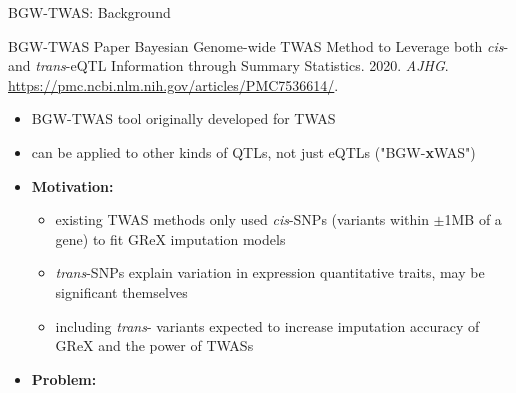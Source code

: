 \begin{frame}{BGW-TWAS: Background}
  \begin{block}{BGW-TWAS Paper}
    Bayesian Genome-wide TWAS Method to Leverage both \textit{cis}- and \textit{trans}-eQTL Information through Summary Statistics. 2020. \textit{AJHG}. \url{https://pmc.ncbi.nlm.nih.gov/articles/PMC7536614/}.
  \end{block}
  \begin{itemize}[<+(1)->]
    \item BGW-TWAS\cite{luninghamBayesianGenomewideTWAS2020} tool originally developed for TWAS
    \item can be applied to other kinds of QTLs, not just eQTLs ("BGW-\textbf{x}WAS")
    \item \textbf{Motivation:}
    \begin{itemize}[<+->]
      \item existing TWAS methods only used \textit{cis}-SNPs (variants within $\pm$1MB of a gene) to fit GReX imputation models
      \item \textit{trans}-SNPs explain variation in expression quantitative traits, may be significant themselves
      \item[$\Rightarrow$] including \textit{trans}- variants expected to increase imputation accuracy of GReX and the power of TWASs
    \end{itemize}
    \item \textbf{Problem:} 
  \end{itemize}
\end{frame}



